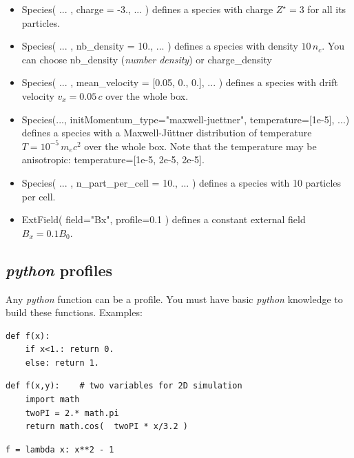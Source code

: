 \documentclass[11pt]{article}
\newcommand{\code}[1]{\colorbox{yellow!15}{\ttfamily #1}}
\newcommand{\python}{\emph{python}\xspace}
\begin{document}
\begin{itemize}

\item \code{Species( ... , charge = -3., ... )} defines a species with charge $Z^\star=3$ for all its particles.

\item \code{Species( ... , nb\_density = 10., ... )} defines a species with density $10\,n_c$.
You can choose \code{nb\_density} (\textit{number density}) or \code{charge\_density}

\item \code{Species( ... , mean\_velocity = [0.05, 0., 0.], ... )} defines a species with drift velocity $v_x = 0.05\,c$ over the whole box.

\item \code{Species(..., initMomentum\_type="maxwell-juettner", temperature=[1e-5], ...)} defines a species with a Maxwell-J\"uttner distribution of temperature $T = 10^{-5}\,m_ec^2$ over the whole box.
Note that the temperature may be anisotropic: \code{temperature=[1e-5, 2e-5, 2e-5]}.

\item \code{Species( ... , n\_part\_per\_cell = 10., ... )} defines a species with 10 particles per cell.

\item \code{ExtField( field="Bx", profile=0.1 )} defines a constant external field $B_x = 0.1 B_0$.

\end{itemize}


 \subsection{\python profiles}
 Any \python function can be a profile. You must have basic \python knowledge to build these functions. Examples:
\begin{lstlisting}
def f(x):
	if x<1.: return 0.
	else: return 1.
\end{lstlisting}
\begin{lstlisting}
def f(x,y):    # two variables for 2D simulation
	import math
	twoPI = 2.* math.pi
	return math.cos(  twoPI * x/3.2 )
\end{lstlisting}
\begin{lstlisting}
f = lambda x: x**2 - 1
\end{lstlisting}
\end{document}

